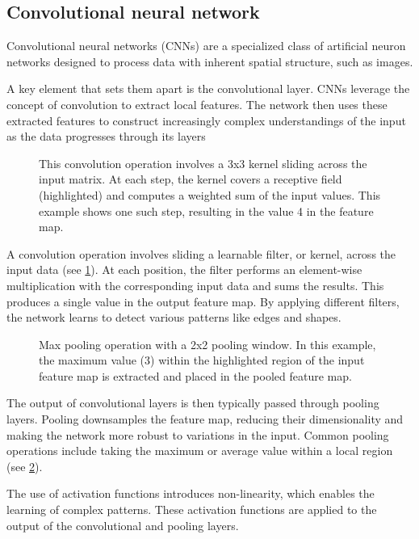 \subsection{Convolutional neural network}
Convolutional neural networks (CNNs) are a specialized class of artificial neuron networks designed to process data with inherent spatial structure, such as images.

A key element that sets them apart is the convolutional layer.
CNNs leverage the concept of convolution to extract local features.
The network then uses these extracted features to construct increasingly complex understandings of the input as the data progresses through its layers

\begin{figure}[hbtp]
    \centering    
    
    \caption{
        This convolution operation involves a 3x3 kernel sliding across the input matrix.
        At each step, the kernel covers a receptive field (highlighted) and computes a weighted sum of the input values.
        This example shows one such step, resulting in the value 4 in the feature map.
    }
    \label{fig:2dconv}
\end{figure}

A convolution operation involves sliding a learnable filter, or kernel, across the input data (see \cref{fig:2dconv}).
At each position, the filter performs an element-wise multiplication with the corresponding input data and sums the results.
This produces a single value in the output feature map.
By applying different filters, the network learns to detect various patterns like edges and shapes.

\begin{figure}[hbtp]
    \centering    
    
    \caption{
        Max pooling operation with a 2x2 pooling window.
        In this example, the maximum value (3) within the highlighted region of the input feature map is extracted and placed in the pooled feature map.
    }
    \label{fig:maxpooling}
\end{figure}

The output of convolutional layers is then typically passed through pooling layers.
Pooling downsamples the feature map, reducing their dimensionality and making the network more robust to variations in the input.
Common pooling operations include taking the maximum or average value within a local region (see \cref{fig:maxpooling}). 

The use of activation functions introduces non-linearity, which enables the learning of complex patterns.
These activation functions are applied to the output of the convolutional and pooling layers.

